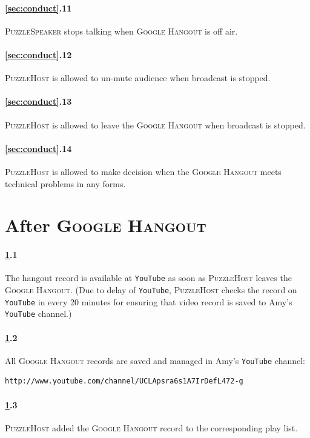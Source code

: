 \documentclass{article}
\newcommand{\hangout}{\textsc{Google Hangout}\xspace}
\newcommand{\host}{\textsc{PuzzleHost}\xspace}
\newcommand{\speaker}{\textsc{PuzzleSpeaker}\xspace}
\begin{document}
\paragraph{\ref{sec:conduct}.11} \speaker stops talking when \hangout is off air.

\paragraph{\ref{sec:conduct}.12} \host is allowed to un-mute audience when broadcast is stopped.

\paragraph{\ref{sec:conduct}.13} \host is allowed to leave the \hangout when broadcast is stopped.

\paragraph{\ref{sec:conduct}.14} \host is allowed to make decision when the \hangout meets technical problems in any forms.

\clearpage
\section{After \hangout} \label{sec:end}

\paragraph{\ref{sec:end}.1} The hangout record is available at \texttt{YouTube} as soon as \host leaves the \hangout. (Due to delay of \texttt{YouTube}, \host checks the record on \texttt{YouTube} in every 20 minutes for ensuring that video record is saved to Amy's \texttt{YouTube} channel.)

\paragraph{\ref{sec:end}.2} All \hangout records are saved and managed in Amy's \texttt{YouTube} channel:
\begin{verbatim}
http://www.youtube.com/channel/UCLApsra6s1A7IrDefL472-g
\end{verbatim}

\paragraph{\ref{sec:end}.3} \host added the \hangout record to the corresponding play list.
\end{document}
